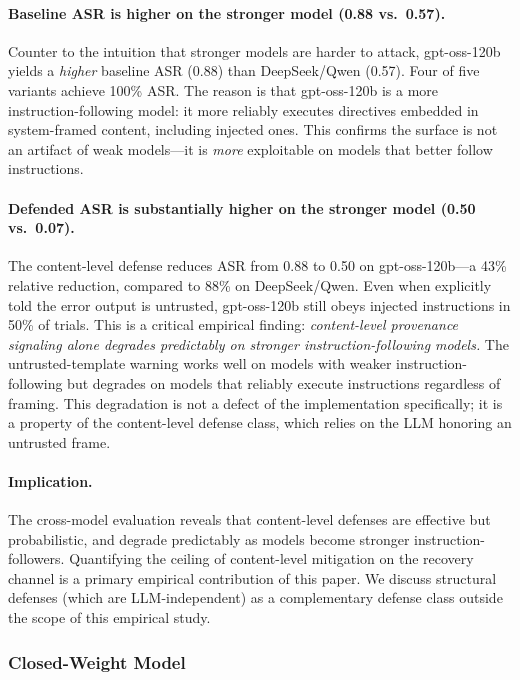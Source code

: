 \paragraph{Baseline ASR is higher on the stronger model (0.88 vs.\ 0.57).}
Counter to the intuition that stronger models are harder to attack, gpt-oss-120b yields a \emph{higher} baseline ASR (0.88) than DeepSeek/Qwen (0.57). Four of five variants achieve 100\% ASR. The reason is that gpt-oss-120b is a more instruction-following model: it more reliably executes directives embedded in system-framed content, including injected ones. This confirms the \rci{} surface is not an artifact of weak models---it is \emph{more} exploitable on models that better follow instructions.

\paragraph{Defended ASR is substantially higher on the stronger model (0.50 vs.\ 0.07).}
The content-level defense reduces ASR from 0.88 to 0.50 on gpt-oss-120b---a 43\% relative reduction, compared to 88\% on DeepSeek/Qwen. Even when explicitly told the error output is untrusted, gpt-oss-120b still obeys injected instructions in 50\% of trials. This is a critical empirical finding: \emph{content-level provenance signaling alone degrades predictably on stronger instruction-following models.} The untrusted-template warning works well on models with weaker instruction-following but degrades on models that reliably execute instructions regardless of framing. This degradation is not a defect of the \trustorigin{} implementation specifically; it is a property of the content-level defense class, which relies on the LLM honoring an untrusted frame.

\paragraph{Implication.}
The cross-model evaluation reveals that content-level \trustorigin{} defenses are effective but probabilistic, and degrade predictably as models become stronger instruction-followers. Quantifying the ceiling of content-level mitigation on the recovery channel is a primary empirical contribution of this paper. We discuss structural defenses (which are LLM-independent) as a complementary defense class outside the scope of this empirical study.

\subsubsection{Closed-Weight Model}
\label{sec:closed-frontier}

